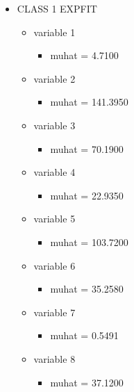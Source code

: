 \documentclass[a4paper]{article}
\begin{document}
\begin{itemize}
    
    \item CLASS 1 EXPFIT
    \begin{itemize}
        \item variable 1
        \begin{itemize}
            \item muhat = 4.7100
        \end{itemize}
        \item variable 2
        \begin{itemize}
            \item muhat = 141.3950
        \end{itemize}
        \item variable 3
        \begin{itemize}
            \item muhat = 70.1900
        \end{itemize}
        \item variable 4
        \begin{itemize}
            \item muhat = 22.9350
        \end{itemize}
        \item variable 5
        \begin{itemize}
            \item muhat = 103.7200
        \end{itemize}
        \item variable 6
        \begin{itemize}
            \item muhat = 35.2580
        \end{itemize}
        \item variable 7
        \begin{itemize}
            \item muhat = 0.5491
        \end{itemize}
        \item variable 8
        \begin{itemize}
            \item muhat = 37.1200
        \end{itemize}
    \end{itemize}
    

\end{itemize}
\end{document}
